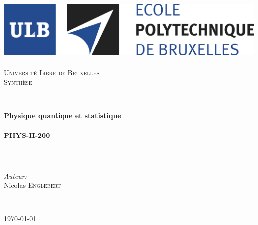 \documentclass	[11pt, a4paper, openany]{book}
\begin{document}
\renewcommand{\proofname}{Démonstration}
\frontmatter
\begin{titlepage}
\begin{center}	
	
	\newcommand{\HRule}{\rule{\linewidth}{0.5mm}}   			%
	\includegraphics[scale=0.11]{logo.jpg}~\\[1cm]				%

	\textsc{\LARGE Université Libre de Bruxelles}\\[1.5cm]
	\textsc{\Large Synthèse}\\[0.5cm]

	\HRule \\[0.4cm]
	{ \huge \bfseries Physique quantique et statistique \\ \ \\ PHYS-H-200 \\[0.4cm] }


	\HRule \\[1.5cm]
		\begin{minipage}{0.4\textwidth}
		\begin{flushleft} \large
		
		\emph{Auteur:}\\
			Nicolas \textsc{Englebert}\\
			\end{flushleft}
			\end{minipage}
			\begin{minipage}{0.4\textwidth}
			\begin{flushright} \large
			\emph{} \\		
			\textsc{}
			\end{flushright}
		\end{minipage}

	\vfill

{\large \today}

\end{center}
\end{titlepage}

\tableofcontents



\mainmatter
\end{document}
